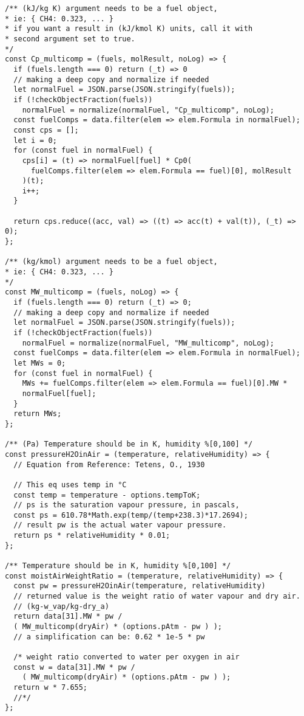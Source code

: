 \begin{verbatim}
/** (kJ/kg K) argument needs to be a fuel object,
* ie: { CH4: 0.323, ... }
* if you want a result in (kJ/kmol K) units, call it with 
* second argument set to true.
*/
const Cp_multicomp = (fuels, molResult, noLog) => {
  if (fuels.length === 0) return (_t) => 0
  // making a deep copy and normalize if needed
  let normalFuel = JSON.parse(JSON.stringify(fuels));
  if (!checkObjectFraction(fuels)) 
    normalFuel = normalize(normalFuel, "Cp_multicomp", noLog);
  const fuelComps = data.filter(elem => elem.Formula in normalFuel);
  const cps = [];
  let i = 0;
  for (const fuel in normalFuel) {
    cps[i] = (t) => normalFuel[fuel] * Cp0(
      fuelComps.filter(elem => elem.Formula == fuel)[0], molResult
    )(t);
    i++;
  }
  
  return cps.reduce((acc, val) => ((t) => acc(t) + val(t)), (_t) => 0);
};

/** (kg/kmol) argument needs to be a fuel object,
* ie: { CH4: 0.323, ... }
*/
const MW_multicomp = (fuels, noLog) => {
  if (fuels.length === 0) return (_t) => 0;
  // making a deep copy and normalize if needed
  let normalFuel = JSON.parse(JSON.stringify(fuels));
  if (!checkObjectFraction(fuels)) 
    normalFuel = normalize(normalFuel, "MW_multicomp", noLog);
  const fuelComps = data.filter(elem => elem.Formula in normalFuel);
  let MWs = 0;
  for (const fuel in normalFuel) {
    MWs += fuelComps.filter(elem => elem.Formula == fuel)[0].MW * 
    normalFuel[fuel];
  }
  return MWs;
};

/** (Pa) Temperature should be in K, humidity %[0,100] */
const pressureH2OinAir = (temperature, relativeHumidity) => {
  // Equation from Reference: Tetens, O., 1930

  // This eq uses temp in °C
  const temp = temperature - options.tempToK;
  // ps is the saturation vapour pressure, in pascals,
  const ps = 610.78*Math.exp(temp/(temp+238.3)*17.2694);
  // result pw is the actual water vapour pressure.
  return ps * relativeHumidity * 0.01;
};

/** Temperature should be in K, humidity %[0,100] */
const moistAirWeightRatio = (temperature, relativeHumidity) => {
  const pw = pressureH2OinAir(temperature, relativeHumidity)
  // returned value is the weight ratio of water vapour and dry air.
  // (kg-w_vap/kg-dry_a)
  return data[31].MW * pw / 
  ( MW_multicomp(dryAir) * (options.pAtm - pw ) );
  // a simplification can be: 0.62 * 1e-5 * pw
  
  /* weight ratio converted to water per oxygen in air
  const w = data[31].MW * pw / 
    ( MW_multicomp(dryAir) * (options.pAtm - pw ) );
  return w * 7.655;
  //*/
};


\end{verbatim}

